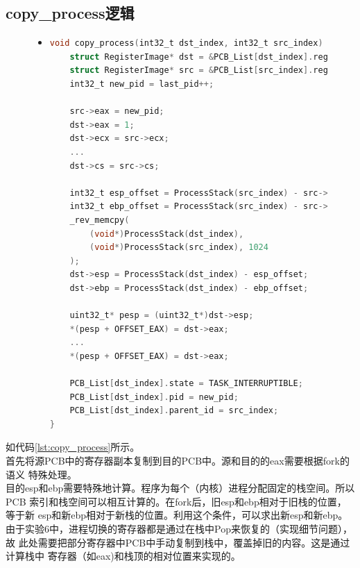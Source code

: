 \documentclass[a4paper]{article}
\begin{document}
    \subsection{copy\_process逻辑}
    \begin{figure}[!hbt]
    \begin{itemize}
    \item[] \begin{lstlisting}[language=C, label=lst:copy_process, caption=copy\_process的主要代码]
void copy_process(int32_t dst_index, int32_t src_index) {
    struct RegisterImage* dst = &PCB_List[dst_index].register_image;
    struct RegisterImage* src = &PCB_List[src_index].register_image; 
    int32_t new_pid = last_pid++;

    src->eax = new_pid;
    dst->eax = 1;
    dst->ecx = src->ecx;
    ...
    dst->cs = src->cs;

    int32_t esp_offset = ProcessStack(src_index) - src->esp;
    int32_t ebp_offset = ProcessStack(src_index) - src->ebp;
    _rev_memcpy(
        (void*)ProcessStack(dst_index), 
        (void*)ProcessStack(src_index), 1024
    );
    dst->esp = ProcessStack(dst_index) - esp_offset;
    dst->ebp = ProcessStack(dst_index) - ebp_offset;

    uint32_t* pesp = (uint32_t*)dst->esp;
    *(pesp + OFFSET_EAX) = dst->eax;
    ...
    *(pesp + OFFSET_EAX) = dst->eax;

    PCB_List[dst_index].state = TASK_INTERRUPTIBLE;
    PCB_List[dst_index].pid = new_pid;
    PCB_List[dst_index].parent_id = src_index;
}
    \end{lstlisting}
    \end{itemize}
    \end{figure}
    如代码\ref{lst:copy_process}所示。\\ 

    首先将源PCB中的寄存器副本复制到目的PCB中。源和目的的eax需要根据fork的语义
    特殊处理。\\ 

    目的esp和ebp需要特殊地计算。程序为每个（内核）进程分配固定的栈空间。所以PCB
    索引和栈空间可以相互计算的。在fork后，旧esp和ebp相对于旧栈的位置，等于新
    esp和新ebp相对于新栈的位置。利用这个条件，可以求出新esp和新ebp。\\ 

    由于实验6中，进程切换的寄存器都是通过在栈中Pop来恢复的（实现细节问题），故
    此处需要把部分寄存器中PCB中手动复制到栈中，覆盖掉旧的内容。这是通过计算栈中
    寄存器（如eax)和栈顶的相对位置来实现的。\\ 
\end{document}
